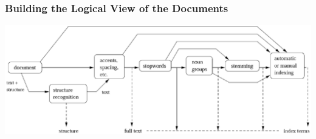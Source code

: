 \documentclass[svgnames]{beamer}
\begin{document}

\begin{frame}
    \frametitle{Building the Logical View of the Documents}

    \begin{block}{}
        \includegraphics[width=\textwidth]{logical}
    \end{block}  
    
\end{frame}



\end{document}
